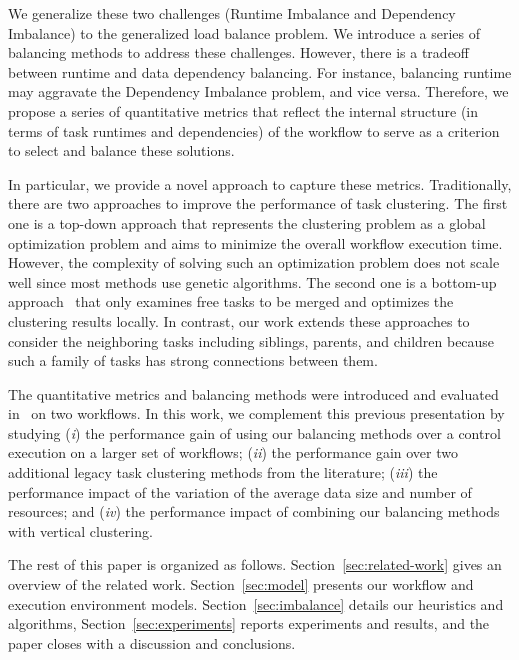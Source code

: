 We generalize these two challenges (Runtime Imbalance and Dependency Imbalance) to the generalized load balance problem. We introduce a series of balancing methods to address these challenges. However, there is a tradeoff between runtime and data dependency balancing. For instance, balancing runtime may aggravate the Dependency Imbalance problem, and vice versa. Therefore, we propose a series of quantitative metrics that reflect the internal structure (in terms of task runtimes and dependencies) of the workflow to serve as a criterion to select and balance these solutions.

In particular, we provide a novel approach to capture these metrics. Traditionally, there are two approaches to improve the performance of task clustering. The first one is a top-down approach \cite{6217508} that represents the clustering problem as a global optimization problem and aims to minimize the overall workflow execution time. However, the complexity of solving such an optimization problem does not scale well since most methods use genetic algorithms. The second one is a bottom-up approach~\cite{Muthuvelu:2005:DJG:1082290.1082297,Liu2009} that only examines free tasks to be merged and optimizes the clustering results locally. In contrast, our work extends these approaches to consider the neighboring tasks including siblings, parents, and children because such a family of tasks has strong connections between them. 

The quantitative metrics and balancing methods were introduced and evaluated in~\cite{6683907} on two workflows. In this work, we complement this previous presentation by studying (\emph{i}) the performance gain of using our balancing methods over a control execution on a larger set of workflows; (\emph{ii}) the performance gain over two additional legacy task clustering methods from the literature; (\emph{iii}) the performance impact of the variation of the average data size and number of resources; and (\emph{iv}) the performance impact of combining our balancing methods with vertical clustering.

The rest of this paper is organized as follows. Section~\ref{sec:related-work} gives an overview of the related work. Section~\ref{sec:model} presents our workflow and execution environment models. Section~\ref{sec:imbalance} details our heuristics and algorithms, Section~\ref{sec:experiments} reports experiments and results, and the paper closes with a discussion and conclusions.

